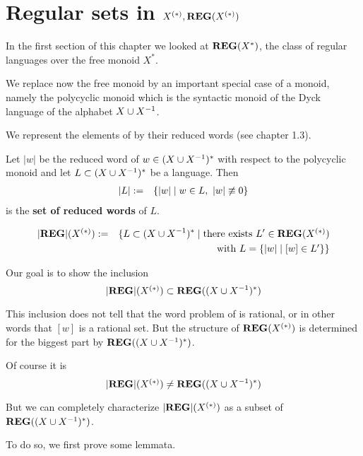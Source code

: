 \section{Regular sets in \texorpdfstring{$\mbox{${X}^{(*)}$},\mbox{{\bf REG}}(\mbox{${X}^{(*)}$})$}{P(X), REG(P(X))}}

In the first section of this chapter we looked at $\mbox{{\bf REG}}(X^*)$, the class of
regular languages over the free monoid $X^*$.

We replace now the free monoid by an important special case of a monoid, namely
the polycyclic monoid  which is the syntactic monoid of the Dyck
language of the alphabet $X \cup {X}^{-1}$.

We represent the elements of  by their reduced words (see chapter
1.3).

\begin{definition}
Let $|w|$ be the reduced word of $w \in (X \cup {X}^{-1})^*$ with respect to the
polycyclic monoid  and let $L \subset (X \cup {X}^{-1})^*$ be a
language. Then
\begin{eqnarray*}
|L| &:=& \mbox{$\{|w| \mid w \in L,\ |w| \not\equiv 0\}$}
\end{eqnarray*}
is the {\bf set of reduced words} of $L$.
\end{definition}

\bigskip
\begin{definition}
\begin{eqnarray*}
|\mbox{{\bf REG}}|(\mbox{${X}^{(*)}$}) & := & \{ L \subset (X\cup X^{-1})^* \mid \mbox{there
exists }L' \in \mbox{{\bf REG}}(\mbox{${X}^{(*)}$}) \\
& & \mbox{ with } L = \mbox{$\{|w| \mid [w] \in L'\}$} \}
\end{eqnarray*}
\end{definition}

Our goal is to show the inclusion
\[ |\mbox{{\bf REG}}|(\mbox{${X}^{(*)}$}) \subset \mbox{{\bf REG}}((X \cup {X}^{-1})^*) \]

This inclusion does not tell that the word problem of  is rational,
or in other words that $[w]$ is a rational set. But the structure of
$\mbox{{\bf REG}}(\mbox{${X}^{(*)}$})$ is determined for the biggest part by $\mbox{{\bf REG}}(
(X \cup {X}^{-1})^*)$.

Of course it is
\[ |\mbox{{\bf REG}}|(\mbox{${X}^{(*)}$}) \neq \mbox{{\bf REG}}((X \cup {X}^{-1})^*) \]

But we can completely characterize $|\mbox{{\bf REG}}|(\mbox{${X}^{(*)}$})$ as a subset of $\mbox{{\bf REG}}((X
\cup X^{-1})^*)$.

To do so, we first prove some lemmata.

